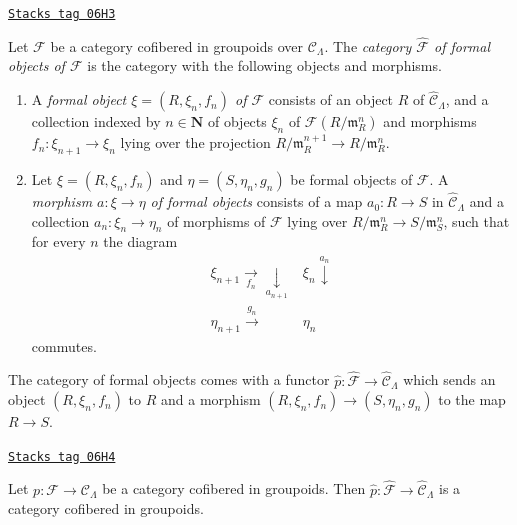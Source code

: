 \begin{definition}
\label{formal-defos-definition-formal-objects}
\href{https://stacks.math.columbia.edu/tag/06H3}{\texttt{Stacks tag 06H3}}

Let $\mathcal{F}$ be a category cofibered in groupoids over
$\mathcal{C}_\Lambda$. The {\it category $\widehat{\mathcal{F}}$ of formal
objects of  $\mathcal{F}$} is the category with the following objects and
morphisms.
\begin{enumerate}
\item A {\it formal object $\xi = (R, \xi_n, f_n)$ of $\mathcal{F}$}
consists of an object $R$ of $\widehat{\mathcal{C}}_\Lambda$, and a collection
indexed by $n \in \mathbf{N}$ of objects $\xi_n$ of
$\mathcal{F}(R/\mathfrak m_R^n)$ and morphisms
$f_n : \xi_{n + 1} \to \xi_n$ lying over the projection
$R/\mathfrak m_R^{n + 1} \to R/\mathfrak m_R^n$.
\item Let $\xi = (R, \xi_n, f_n)$ and $\eta = (S, \eta_n, g_n)$ be
formal objects of $\mathcal{F}$.  A {\it morphism $a : \xi \to \eta$ of
formal objects} consists of a map $a_0 : R \to S$ in
$\widehat{\mathcal{C}}_\Lambda$ and a collection $a_n : \xi_n \to \eta_n$
of morphisms of $\mathcal{F}$ lying over
$R/\mathfrak m_R^n \to S/\mathfrak m_S^n$,
such that for every $n$ the diagram
$$
\begin{array}{cc}\xi_{n + 1} \underset{f_n}{\longrightarrow}\underset{a_{n + 1}}{\downarrow} & \xi_n \overset{a_n}{\downarrow} \\ \eta_{n + 1} \overset{g_n}{\longrightarrow} & \eta_n\end{array}
$$
commutes.
\end{enumerate}
\end{definition}

The category of formal objects comes with a functor $\widehat{p}:
\widehat{\mathcal{F}} \to \widehat{\mathcal{C}}_\Lambda$ which sends an
object $(R, \xi_n, f_n)$ to $R$ and a morphism
$(R, \xi_n, f_n) \to (S, \eta_n, g_n)$ to the map $R \to S$.

\begin{lemma}
\label{formal-defos-lemma-completion-cofibred}
\href{https://stacks.math.columbia.edu/tag/06H4}{\texttt{Stacks tag 06H4}}

Let $p : \mathcal{F} \to \mathcal{C}_\Lambda$ be a category cofibered in
groupoids. Then
$\widehat{p} : \widehat{\mathcal{F}} \to \widehat{\mathcal{C}}_\Lambda$
is a category cofibered in groupoids.
\end{lemma}

